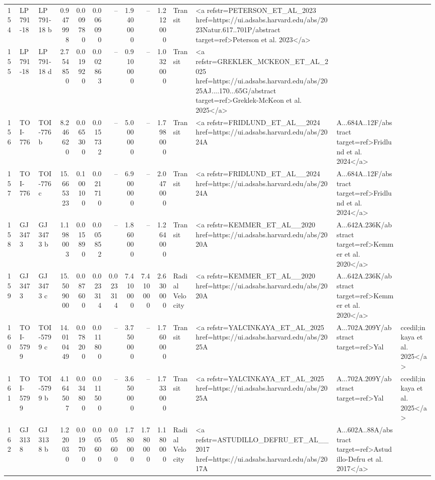 \begin{tabular}{lllrrrrrrrll}
154 & LP 791-18 & LP 791-18 b & 0.947998 & 0.009780 & 0.006090 & -- & 1.940000 & -- & 1.212000 & Transit & <a refstr=PETERSON_ET_AL_2023 href=https://ui.adsabs.harvard.edu/abs/2023Natur.617..701P/abstract target=ref>Peterson et al. 2023</a> \\
155 & LP 791-18 & LP 791-18 d & 2.754850 & 0.019920 & 0.002863 & -- & 0.910000 & -- & 1.032000 & Transit & <a refstr=GREKLEK_MCKEON_ET_AL_2025 href=https://ui.adsabs.harvard.edu/abs/2025AJ....170...65G/abstract target=ref>Greklek-McKeon et al. 2025</a> \\
156 & TOI-776 & TOI-776 b & 8.246620 & 0.065300 & 0.015732 & -- & 5.000000 & -- & 1.798000 & Transit & <a refstr=FRIDLUND_ET_AL__2024 href=https://ui.adsabs.harvard.edu/abs/2024A&A...684A..12F/abstract target=ref>Fridlund et al. 2024</a> \\
157 & TOI-776 & TOI-776 c & 15.665323 & 0.100100 & 0.021710 & -- & 6.900000 & -- & 2.047000 & Transit & <a refstr=FRIDLUND_ET_AL__2024 href=https://ui.adsabs.harvard.edu/abs/2024A&A...684A..12F/abstract target=ref>Fridlund et al. 2024</a> \\
158 & GJ 3473 & GJ 3473 b & 1.198003 & 0.015890 & 0.005852 & -- & 1.860000 & -- & 1.264000 & Transit & <a refstr=KEMMER_ET_AL__2020 href=https://ui.adsabs.harvard.edu/abs/2020A&A...642A.236K/abstract target=ref>Kemmer et al. 2020</a> \\
159 & GJ 3473 & GJ 3473 c & 15.509000 & 0.087600 & 0.023314 & 0.023314 & 7.410000 & 7.410000 & 2.630000 & Radial Velocity & <a refstr=KEMMER_ET_AL__2020 href=https://ui.adsabs.harvard.edu/abs/2020A&A...642A.236K/abstract target=ref>Kemmer et al. 2020</a> \\
160 & TOI-5799 & TOI-5799 c & 14.010449 & 0.078200 & 0.011800 & -- & 3.750000 & -- & 1.760000 & Transit & <a refstr=YALCINKAYA_ET_AL_2025 href=https://ui.adsabs.harvard.edu/abs/2025A&A...702A.209Y/abstract target=ref>Yal&ccedil;inkaya et al. 2025</a> \\
161 & TOI-5799 & TOI-5799 b & 4.164507 & 0.034800 & 0.011500 & -- & 3.650000 & -- & 1.733000 & Transit & <a refstr=YALCINKAYA_ET_AL_2025 href=https://ui.adsabs.harvard.edu/abs/2025A&A...702A.209Y/abstract target=ref>Yal&ccedil;inkaya et al. 2025</a> \\
162 & GJ 3138 & GJ 3138 b & 1.220030 & 0.019700 & 0.005600 & 0.005600 & 1.780000 & 1.780000 & 1.180000 & Radial Velocity & <a refstr=ASTUDILLO_DEFRU_ET_AL__2017 href=https://ui.adsabs.harvard.edu/abs/2017A&A...602A..88A/abstract target=ref>Astudillo-Defru et al. 2017</a> \\

\end{tabular}
